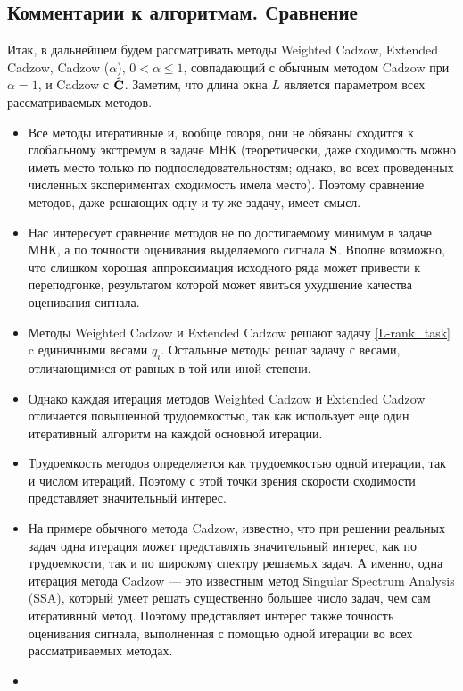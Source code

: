 \documentclass[12pt,a4paper,fleqn,leqno]{article}
\begin{document}
\subsection{Комментарии к алгоритмам. Сравнение}

Итак, в дальнейшем будем рассматривать методы
Weighted Cadzow, Extended Cadzow, Cadzow ($\alpha$), $0< \alpha \leq 1$, совпадающий с обычным методом Cadzow при $\alpha=1$,
и Cadzow с $\widehat {\mathbf{C}}$.
Заметим, что длина окна $L$ является параметром всех рассматриваемых методов.

\begin{itemize}
\item
Все методы итеративные и, вообще говоря, они не обязаны сходится к глобальному экстремум в задаче МНК  (теоретически, даже сходимость можно иметь место только по подпоследовательностям; однако, во всех проведенных численных экспериментах сходимость имела место). Поэтому сравнение методов, даже
решающих одну и ту же задачу, имеет смысл.
\item
Нас интересует сравнение методов не по достигаемому минимум в задаче МНК, а по точности оценивания выделяемого сигнала $\mathbf{S}$.
Вполне возможно, что слишком хорошая аппроксимация исходного ряда может привести к переподгонке, результатом которой
может явиться ухудшение качества оценивания сигнала.
\item
Методы Weighted Cadzow и Extended Cadzow решают задачу \eqref{L-rank_task} c единичными весами $q_i$. Остальные методы решат задачу с весами, отличающимися от равных в той или иной степени.
\item
Однако каждая итерация методов Weighted Cadzow и Extended Cadzow отличается повышенной трудоемкостью, так как использует
еще один итеративный алгоритм на каждой основной итерации.
\item
Трудоемкость методов определяется как трудоемкостью одной итерации, так и числом итераций. Поэтому с этой точки зрения скорости сходимости представляет значительный интерес.
\item
На примере обычного метода Cadzow, известно, что при решении реальных задач одна итерация может представлять значительный интерес, как по трудоемкости, так и по широкому спектру решаемых задач. А именно, одна итерация метода Cadzow --- это известным метод Singular Spectrum Analysis (SSA), который умеет решать существенно большее число задач, чем сам итеративный метод. Поэтому представляет интерес также точность оценивания сигнала, выполненная с помощью одной итерации во всех рассматриваемых методах.
\item

\end{itemize}
\end{document}
